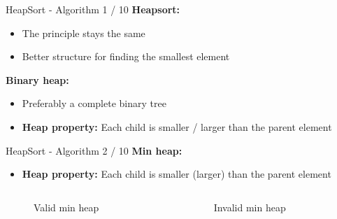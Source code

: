 \documentclass[notes=hide,pdftex,14pt]{beamer}
\begin{document}
\begin{frame}{HeapSort - Algorithm 1 / 10}
  \textbf{Heapsort:}
  \begin{itemize}
    \item
      The principle stays the same
    \item
      Better structure for finding the smallest element
  \end{itemize}
  \textbf{Binary heap:}
  \begin{itemize}
    \item
      Preferably a complete binary tree
    \item
      \textbf{Heap property:} Each child is smaller / larger than the parent
      element
  \end{itemize}
\end{frame}


\begin{frame}{HeapSort - Algorithm 2 / 10}
  \textbf{Min heap:}
  \begin{itemize}
    \item
      \textbf{Heap property:} Each child is {\color{Mittel-Blau}smaller}
      (larger) than the parent element
  \end{itemize}
\vspace*{-2em}
  \begin{columns}
    \begin{column}{0.45\textwidth}
      \begin{figure}[!h]
        \begin{adjustbox}{width=\linewidth}
          
        \end{adjustbox}
        \caption{Valid min heap}
        \label{fig:minheap_valid}
      \end{figure}
    \end{column}%
    \hspace*{0.1em}%
    \begin{column}{0.45\textwidth}
      \begin{figure}[!h]
        \begin{adjustbox}{width=\linewidth}
\rlap{}%
        \end{adjustbox}
        \caption{Invalid min heap}
        \label{fig:minheap_invalid}
      \end{figure}
    \end{column}
  \end{columns}
\end{frame}
\end{document}

